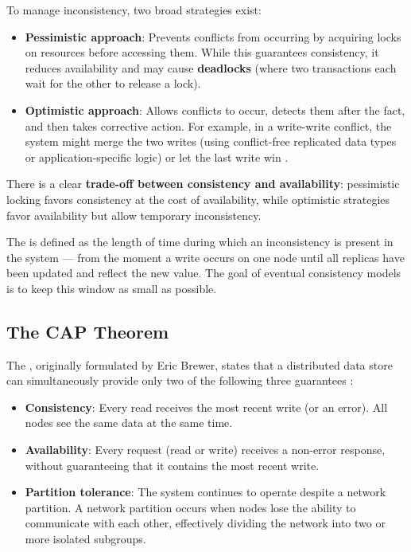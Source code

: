 To manage inconsistency, two broad strategies exist:
\begin{itemize}
    \item \textbf{Pessimistic approach}: Prevents conflicts from occurring by acquiring locks on resources before accessing them. While this guarantees consistency, it reduces availability and may cause \textbf{deadlocks} (where two transactions each wait for the other to release a lock).
    \item \textbf{Optimistic approach}: Allows conflicts to occur, detects them after the fact, and then takes corrective action. For example, in a write-write conflict, the system might merge the two writes (using conflict-free replicated data types or application-specific logic) or let the last write win \cite{kleppmann2017ddia}.
\end{itemize}

There is a clear \textbf{trade-off between consistency and availability}: pessimistic locking favors consistency at the cost of availability, while optimistic strategies favor availability but allow temporary inconsistency.

The  is defined as the length of time during which an inconsistency is present in the system --- from the moment a write occurs on one node until all replicas have been updated and reflect the new value. The goal of eventual consistency models is to keep this window as small as possible.

\subsection{The CAP Theorem}

The , originally formulated by Eric Brewer, states that a distributed data store can simultaneously provide only two of the following three guarantees \cite{kleppmann2017ddia}:

\begin{itemize}
    \item \textbf{Consistency}: Every read receives the most recent write (or an error). All nodes see the same data at the same time.
    \item \textbf{Availability}: Every request (read or write) receives a non-error response, without guaranteeing that it contains the most recent write.
    \item \textbf{Partition tolerance}: The system continues to operate despite a network partition. A network partition occurs when nodes lose the ability to communicate with each other, effectively dividing the network into two or more isolated subgroups.
\end{itemize}

